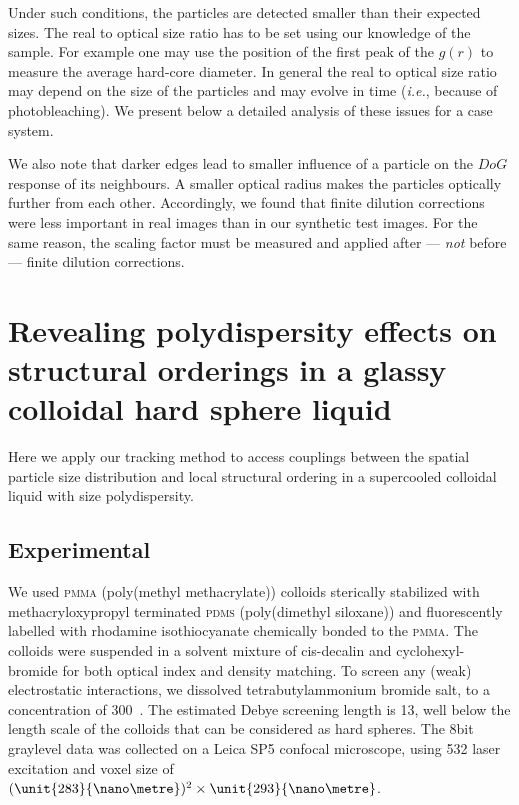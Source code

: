 \documentclass[8.5pt,twoside,twocolumn]{article}
\begin{document}
Under such conditions, the particles are detected smaller than their expected sizes. The real to optical size ratio has to be set using our knowledge of the sample. For example one may use the position of the first peak of the $g(r)$ to measure the average hard-core diameter. In general the real to optical size ratio may depend on the size of the particles and may evolve in time (\emph{i.e.}, because of photobleaching). We present below a detailed analysis of these issues for a case system. 

We also note that darker edges lead to smaller influence of a particle on the $DoG$ response of its neighbours. A smaller optical radius makes the particles optically further from each other. Accordingly, we found that finite dilution corrections were less important in real images than in our synthetic test images. For the same reason, the scaling factor must be measured and applied after --- \emph{not} before --- finite dilution corrections.


\section{Revealing polydispersity effects on structural orderings in a glassy colloidal hard sphere liquid}
\label{sec:yon6}

Here we apply our tracking method to access couplings between the spatial particle size distribution and local structural ordering 
in a supercooled colloidal liquid with size polydispersity.  

\subsection{Experimental}
We used \textsc{pmma} (poly(methyl methacrylate)) colloids sterically stabilized with methacryloxypropyl terminated \textsc{pdms} (poly(dimethyl siloxane)) and fluorescently labelled with rhodamine isothiocyanate chemically bonded to the \textsc{pmma}. The colloids were suspended in a solvent mixture of cis-decalin and cyclohexyl-bromide for both optical index and density matching. To screen any (weak) electrostatic interactions, we dissolved tetrabutylammonium bromide salt, to a concentration of \unit{300}{\nano\mole\per\liter}~\citep{royall2005}. The estimated Debye screening length is \unit{13}{\nano\metre}, well below the length scale of the colloids that can be considered as hard spheres. The \unit{8}{bit} graylevel data was collected on a Leica SP5 confocal microscope, using \unit{532}{\nano\meter} laser excitation and voxel size of $(\unit{283}{\nano\metre})^2\times\unit{293}{\nano\metre}$.
\end{document}

